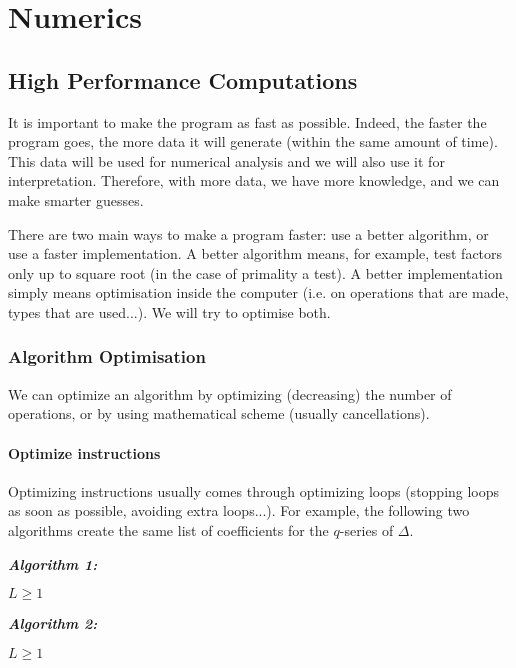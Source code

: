 \section{Numerics}
\subsection{High Performance Computations}
It is important to make the program as fast as possible.
Indeed, the faster the program goes, the more data it will generate (within the same amount of time).
This data will be used for numerical analysis and we will also use it for interpretation.
Therefore, with more data, we have more knowledge, and we can make smarter guesses.

There are two main ways to make a program faster:
use a better algorithm, or 
use a faster implementation.
A better algorithm means, for example, test factors only up to square root (in the case of primality a test).
A better implementation simply means optimisation inside the computer (i.e. on operations that are made, types that are used...).
We will try to optimise both.


\subsubsection{Algorithm Optimisation}
\label{algorithmOptimisation}
We can optimize an algorithm by optimizing (decreasing) the number of operations, or by using mathematical scheme (usually cancellations).

\paragraph{Optimize instructions}
Optimizing instructions usually comes through optimizing loops (stopping loops as soon as possible, avoiding extra loops...).
For example, the following two algorithms create the same list of coefficients for the $q$-series of $\Delta$.

\textbf{\textit{Algorithm 1:}}
\begin{algorithmic}
	\color{CodeColor}
	\Require $L \geq 1$
		\EndIf
	\EndWhile
\end{algorithmic}

\textit{\textbf{Algorithm 2:}}
\begin{algorithmic}
	\color{CodeColor}
	\Require $L \geq 1$
	\EndWhile
\end{algorithmic}


